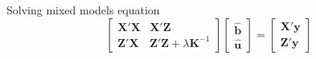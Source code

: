 \documentclass[
  ignorenonframetext,
  aspectratio=169,
]{beamer}
\begin{document}
\begin{frame}{Solving mixed models equation}
\label{solving-mixed-models-equation}
\[ 
\begin{bmatrix}
 \mathbf{X}'\mathbf{X} & \mathbf{X}'\mathbf{Z} \\
 \mathbf{Z}'\mathbf{X} & \mathbf{Z}'\mathbf{Z} + \lambda \mathbf{K}^{-1}
\end{bmatrix}
\begin{bmatrix}
 \mathbf{\hat{b}} \\
 \mathbf{\hat{u}}
\end{bmatrix}
=
\begin{bmatrix}
 \mathbf{X}'\mathbf{y} \\
 \mathbf{Z}'\mathbf{y}
\end{bmatrix}
\]

\begin{table}

\caption{\label{tbl-mixed-models}mixed models matrices}

\begin{minipage}{0.25\linewidth}



\end{minipage}%
%
\begin{minipage}{0.25\linewidth}



\end{minipage}%
%
\begin{minipage}{0.25\linewidth}


\end{minipage}
\end{table}
\end{frame}
\end{document}
